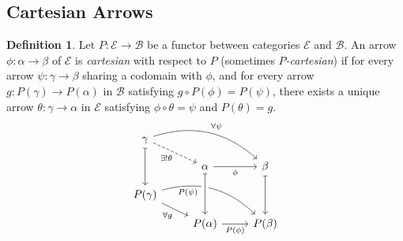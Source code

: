 \documentclass[10pt]{article}
\theoremstyle{definition}
\newtheorem{definition}{Definition}[section]
\theoremstyle{remark}
\newcommand{\catB}{\mathcal{B}}
\newcommand{\catE}{\mathcal{E}}
\begin{document}
\subsection{Cartesian Arrows}
\begin{definition}
    Let $P : \catE \to \catB$ be a functor between categories $\catE$ and $\catB$. An arrow $\phi : \alpha \to \beta$ of $\catE$ is \textit{cartesian} with respect to $P$ (sometimes \textit{$P$-cartesian}) if for every arrow $\psi : \gamma \to \beta$ sharing a codomain with $\phi$, and for every arrow $g : P(\gamma) \to P(\alpha)$ in $\catB$ satisfying $g \circ P(\phi) = P(\psi)$, there exists a unique arrow $\theta : \gamma \to \alpha$ in $\catE$ satisfying $\phi \circ \theta = \psi$ and $P(\theta) = g$.
    \begin{equation}
        \begin{tikzcd}[row sep=small]
            \gamma \arrow[rd, dashed, "\exists!\theta"'] \arrow[rrd, bend left, "\forall\psi"] \arrow[dd, mapsto] & & \\
            & \alpha \arrow[r, "\phi"'] & \beta \arrow[dd, mapsto] \\
            P(\gamma) \arrow[rd, "\forall g"'] \arrow[rrd, bend left, "P(\psi)"' near start] & & \\
            & P(\alpha) \arrow[r, "P(\phi)"'] \arrow[from=uu, mapsto, crossing over] & P(\beta)
        \end{tikzcd}
    \end{equation}
\end{definition}
\end{document}

